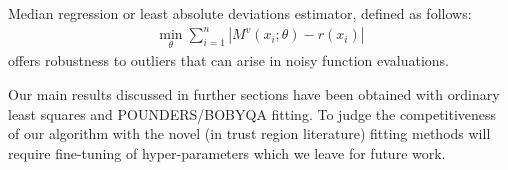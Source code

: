 Median regression or least absolute deviations estimator, defined as follows:
\begin{align}
    \min\limits_{\theta}\sum\limits_{i=1}^{n}|M^v(x_i;\theta)-r(x_i)|
    \label{eq:fit-lad}
\end{align}
offers robustness to outliers that can arise in noisy function evaluations.

Our main results discussed in further sections have been obtained with ordinary least squares and POUNDERS/BOBYQA fitting. To judge the competitiveness of our algorithm with the novel (in trust region literature) fitting methods will require fine-tuning of hyper-parameters which we leave for future work.
